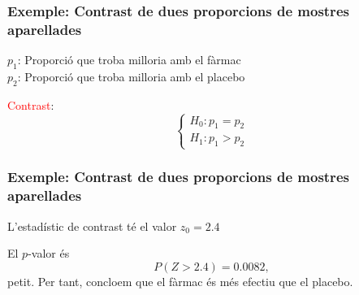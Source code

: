 \documentclass[12pt,t]{beamer}\usepackage[]{graphicx}\usepackage[]{color}
\newcommand{\red}[1]{\textcolor{red}{#1}}
\renewcommand{\emph}[1]{{\color{red}#1}}
\renewcommand{\geq}{\geqslant}
\theoremstyle{plain}
\theoremstyle{definition}
\begin{document}
\begin{frame}
\frametitle{Exemple: Contrast de dues proporcions de mostres aparellades}

$p_1$: Proporció que troba milloria amb el fàrmac\\
$p_2$: Proporció que troba milloria amb el placebo
\medskip

\red{Contrast}:
$$
\left\{\begin{array}{l}
H_0:p_1=p_2\\
H_1:p_1> p_2
\end{array}\right.
$$
\end{frame}




\begin{frame}
\frametitle{Exemple: Contrast de dues proporcions de mostres aparellades}

L'estadístic de contrast té el valor $z_0=2.4$
\medskip

El $p$-valor és
$$
P(Z>2.4)=0.0082,
$$
petit. Per tant, concloem que el fàrmac és més efectiu que el placebo.
\end{frame}
\end{document}
